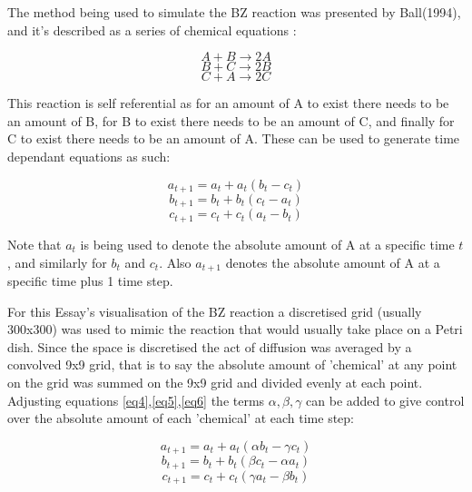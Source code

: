 \documentclass[12pt, A4]{article}
\begin{document}

The method being used to simulate the BZ reaction was presented by Ball(1994)\cite{ball1996designing}, 
and it's described as a series of chemical equations \cite{turner2009simple}:

\begin{equation}\label{eq1}
  A+B \rightarrow 2A
\end{equation}
\begin{equation}\label{eq2}
  B+C \rightarrow 2B
\end{equation}
\begin{equation}\label{eq3}
  C+A \rightarrow 2C
\end{equation}


This reaction is self referential as for an amount of A to exist there needs to be an 
amount of B, for B to exist there needs to be an amount of C, and finally for C to exist there 
needs to be an amount of A. These can be used to generate time dependant equations as such:

\begin{equation}\label{eq4}
  a_{t+1}=a_t+a_t(b_t-c_t)
\end{equation}
\begin{equation}\label{eq5}
  b_{t+1}=b_t+b_t(c_t-a_t)
\end{equation}
\begin{equation}\label{eq6}
  c_{t+1}=c_t+c_t(a_t-b_t)
\end{equation}

Note that $a_t$ is being used to denote the absolute amount of A at a specific time $t$, and 
similarly for $b_t$ and $c_t$. Also $a_{t+1}$ denotes the absolute amount of A at a specific time 
plus 1 time step.


For this Essay's visualisation of the BZ reaction a discretised grid (usually 300x300) was used to mimic 
the reaction that would usually take place on a Petri dish. Since the space is discretised 
the act of diffusion was averaged by a convolved 9x9 grid, that is to say the absolute 
amount of 'chemical' at any point on the grid was summed on the 9x9 grid and divided evenly 
at each point. Adjusting equations \ref{eq4},\ref{eq5},\ref{eq6} the terms $\alpha,\beta,\gamma$ 
can be added to give control over the absolute amount of each 'chemical' at each time step:

\begin{equation}\label{eq7}
  a_{t+1}=a_t+a_t(\alpha b_t-\gamma c_t)
\end{equation}
\begin{equation}\label{eq8}
  b_{t+1}=b_t+b_t(\beta c_t-\alpha a_t)
\end{equation}
\begin{equation}\label{eq9}
  c_{t+1}=c_t+c_t(\gamma a_t-\beta b_t)
\end{equation}
\end{document}
